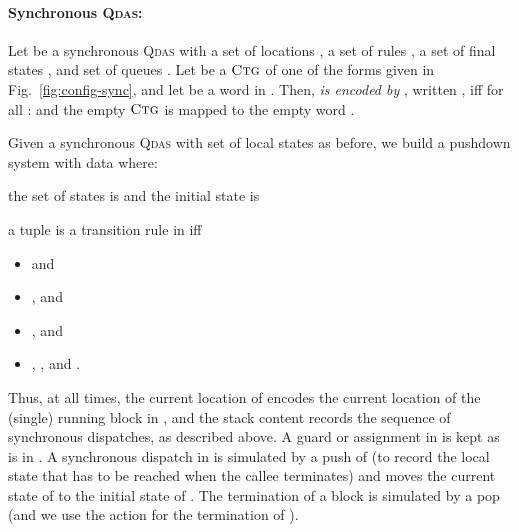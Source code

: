 \documentclass[runningheads,oribibl,]{article}
\newcommand{\qdas}{\textsc{Qdas}\xspace}
\newcommand{\ctg}{\ensuremath{\textsc{Ctg}}\xspace}
\newenvironment{myitemize}{\begin{list}{\labelitemi}{\setlength{\topsep}{4pt}\setlength{\partopsep}{0pt}
\setlength{\itemsep}{0pt}
\setlength{\itemindent}{0ex}
\setlength{\listparindent}{0ex}
\setlength{\leftmargin}{4ex}\setlength{\labelwidth}{2ex}
}}
{\end{list}}
\begin{document}
\paragraph{\bf Synchronous \qdas:}


Let  be a synchronous \qdas with a set of locations ,
a set of rules , a set of final states , and
set of queues . Let  be a \ctg of one of the forms given
in Fig.~\ref{fig:config-sync}, and let  be a word
in . Then, \emph{ is encoded by },
written , iff for all :
 and the empty \ctg is mapped to the empty word .

Given a synchronous \qdas  with set of local
states  as before, we build a pushdown system with data
 where:
\begin{myitemize}
\item the set of states is  and the initial state is
  
\item 
\item a tuple  is a transition rule in  iff
  \begin{itemize}
    \renewcommand{\labelitemi}{\bf}
  \item  and
    
  \item ,  and
    
  \item ,  and 
  \item , , and .
  \end{itemize}
\end{myitemize}
Thus, at all times, the current location of  encodes the
current location of the (single) running block in , and the stack
content records the sequence of synchronous dispatches, as described
above. A guard or assignment in  is kept as is in . A
synchronous dispatch  in  is simulated
by a push of  (to record the local state that has to be reached
when the callee terminates) and moves the current state of  to
the initial state of . The termination of a block is simulated
by a pop (and we use the  action for the termination of
).
\end{document}
